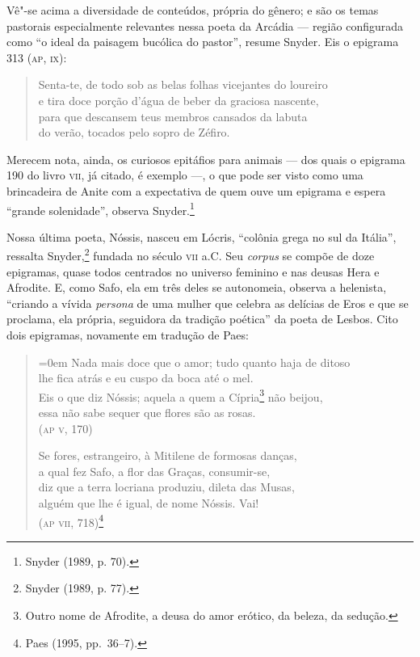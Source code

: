 Vê"-se acima a diversidade de conteúdos, própria do gênero; e são os temas
pastorais especialmente relevantes nessa poeta da Arcádia --- região configurada
como “o ideal da paisagem bucólica do pastor”, resume Snyder. Eis o epigrama
313 (\textsc{ap}, \textsc{ix}):

\begin{quote}
Senta-te, de todo sob as belas folhas vicejantes do loureiro\\
e tira doce porção d’água de beber da graciosa nascente,\\
para que descansem teus membros cansados da labuta\\
do verão, tocados pelo sopro de Zéfiro.
\end{quote}

Merecem nota, ainda, os curiosos epitáfios para animais --- dos quais o epigrama
190 do livro \textsc{vii}, já citado, é exemplo ---, o que pode ser visto como uma
brincadeira de Anite com a expectativa de quem ouve um epigrama e espera
“grande solenidade”, observa Snyder.\footnote{ Snyder (1989, p. 70).} 

Nossa última poeta, Nóssis, nasceu em Lócris, “colônia grega no sul da Itália”,
ressalta Snyder,\footnote{ Snyder (1989, p. 77).} fundada no século \textsc{vii} a.C. Seu \textit{corpus} se
compõe de doze epigramas, quase todos centrados no
universo feminino e nas deusas Hera e Afrodite. E, como Safo, ela em três deles
se autonomeia, observa a helenista, “criando a vívida \textit{persona} de uma
mulher que celebra as delícias de Eros e que se proclama, ela própria,
seguidora da tradição poética” da poeta de Lesbos. Cito dois epigramas,
novamente em tradução de Paes:

\begin{quote}\parindent=0em
Nada mais doce que o amor; tudo quanto haja de ditoso\\
lhe fica atrás e eu cuspo da boca até o mel.\\
Eis o que diz Nóssis; aquela a quem a Cípria\footnote{ Outro nome de
Afrodite, a deusa do amor erótico, da beleza, da sedução.} não beijou,\\
essa não sabe sequer que flores são as rosas.\\
\mbox{}\hfill (\textsc{ap v}, 170)

\smallskip

Se fores, estrangeiro, à Mitilene de formosas danças,\\
a qual fez Safo, a flor das Graças, consumir-se,\\ 
diz que a terra locriana produziu, dileta das Musas,\\
alguém que lhe é igual, de nome Nóssis. Vai!\\
\mbox{}\hfill (\textsc{ap vii}, 718)\footnote{ Paes (1995, pp.~36--7).}
\end{quote}

